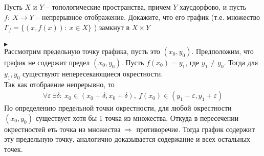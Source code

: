 		\subsection{}
		Пусть $X$ и $Y$ -- топологические пространства, причем $Y$ хаусдорфово, и пусть $f:\ X \to Y$ -- непрерывное отображение. Докажите, что его график (т.е. множество $\Gamma_f = \{(x,f(x)):\ x \in X\}$ )
		замкнут в $X \times Y$\\
		\\
		$\blacktriangleright$\\
		Рассмотрим предельную точку графика, пусть это $(x_0, y_0)$. Предположим, что график не содержит предел $(x_0, y_0)$. Пусть $f(x_0) = y_1$, где $y_1 \ne y_0$. Тогда для $y_1, y_0$ существуют непересекающиеся окрестности.\\
		Так как отобраение непрерывно, то
		\begin{gather*}
			\forall \varepsilon\ \exists \delta:\ x_0 \in (x_0 - \delta, x_0 + \delta),\ f(x_0) \in (y_1 - \varepsilon, y_1 + \varepsilon)
		\end{gather*}
		По определению предельной точки окрестности, для любой окрестности $(x_0, y_0)$ существует хотя бы 1 точка из множества. Откуда в пересечении окрестностей еть точка из множества $\Rightarrow$ противоречие. Тогда график содержит эту предельную точку, аналогично доказывается содержание и всех остальных точек.
		\\
